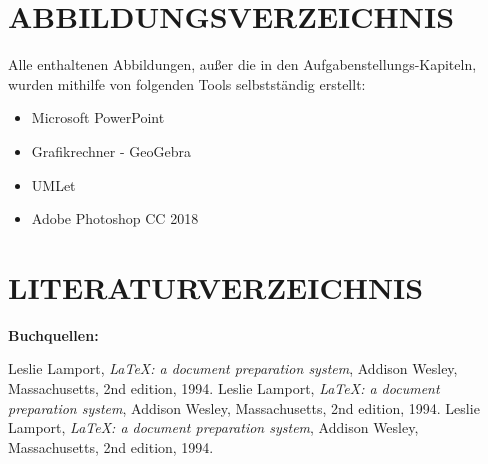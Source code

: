 \documentclass[a4paper,12pt]{article}
\begin{document}

\newpage
\section{ABBILDUNGSVERZEICHNIS}
Alle enthaltenen Abbildungen, außer die in den Aufgabenstellungs-Kapiteln, wurden mithilfe von folgenden Tools selbstständig erstellt:
\begin{itemize}
\item Microsoft PowerPoint
\item Grafikrechner - GeoGebra
\item UMLet
\item Adobe Photoshop CC 2018 
\end{itemize}


\newpage
\section{LITERATURVERZEICHNIS}

\begingroup
\renewcommand{\section}[2]{}%
\begin{large}
\textbf{Buchquellen:}
\end{large}

\begin{thebibliography}{9}

      Leslie Lamport,
      \textit{\LaTeX: a document preparation system},
      Addison Wesley, Massachusetts,
      2nd edition,
      1994.
      Leslie Lamport,
      \textit{\LaTeX: a document preparation system},
      Addison Wesley, Massachusetts,
      2nd edition,
      1994.
      Leslie Lamport,
      \textit{\LaTeX: a document preparation system},
      Addison Wesley, Massachusetts,
      2nd edition,
      1994.

\end{thebibliography}
\end{document}
